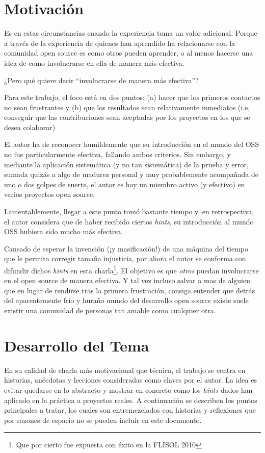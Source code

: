 \section*{Motivación}

Es en estas circunstancias cuando la experiencia toma un valor adicional. Porque
a través de la experiencia de quienes han aprendido ha relacionarse con la
comunidad open source es como otros pueden aprender, o al menos hacerse una idea
de como involucrarse en ella de manera más efectiva.

¿Pero qué quiere decir ``involucrarse de manera más efectiva''?

Para este trabajo, el foco está en dos puntos: (a) hacer que los primeros
contactos no sean frustrantes y (b) que los resultados sean relativamente
inmediatos (i.e, conseguir que las contribuciones sean aceptadas por los
proyectos en los que se desea colaborar)

El autor ha de reconocer humildemente que su introducción en el mundo del OSS no
fue particularmente efectiva, fallando ambos criterios. Sin embargo, y mediante
la aplicación sistemática (y no tan sistemática) de la prueba y error, sumada
quizás a algo de madurez personal y muy probablemente acompañada de uno o dos
golpes de suerte, el autor es hoy un miembro activo (y efectivo) en varios
proyectos open source.

Lamentablemente, llegar a este punto tomó bastante tiempo y, en
retrospectiva, el autor considera que de haber recibido ciertos \emph{hints}, su
introducción al mundo OSS hubiera sido mucho más efectiva. 

Cansado de esperar la invención (¡y masificación!) de una máquina del tiempo que
le permita corregir tamaña injusticia, por ahora el autor se conforma con
difundir dichos \emph{hints} en esta charla\footnote{Que por cierto fue expuesta
  con éxito en la FLISOL 2010}. El objetivo es que \emph{otros} puedan
involucrarse en el open source de manera efectiva. Y tal vez incluso salvar a
mas de alguien que en lugar de rendirse tras la primera frustración, consiga
entender que detrás del aparentemente frío y huraño mundo del desarrollo
open source existe suele existir una comunidad de personas tan amable como
cualquier otra.

\section*{Desarrollo del Tema}

En su calidad de charla más motivacional que técnica, el trabajo se centra en
historias, anécdotas y lecciones consideradas como claves por el autor. La idea
es evitar quedarse en lo abstracto y mostrar en concreto como los \emph{hints}
dados han aplicado en la práctica a proyectos reales. A continuación se
describen los puntos principales a tratar, los cuales son entremezclados con
historias y reflexiones que por razones de espacio no se pueden incluir en este
documento.

